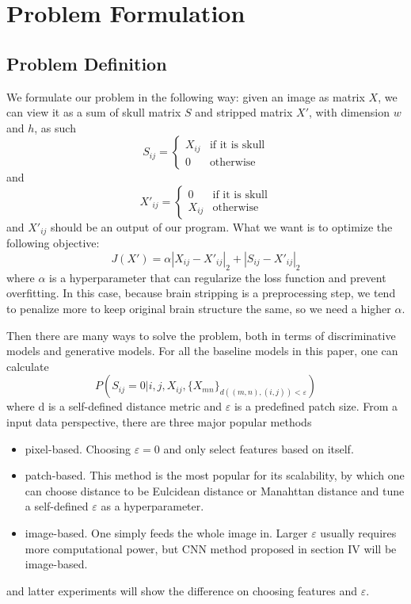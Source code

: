 \documentclass[conference]{IEEEtran}
\begin{document}
\section{Problem Formulation}
\subsection*{Problem Definition}
We formulate our problem in the following way: given an image as matrix $X$, we can view it as a sum of skull matrix $S$ and stripped matrix $X'$, with dimension $w$ and $h$, as such 
\[
S_{ij} = 
\begin{cases}
X_{ij} &\text{if it is skull} \\
0 &\text{otherwise}
\end{cases}
\]
and 
\[
X'_{ij} = 
\begin{cases}
0 &\text{if it is skull} \\
X_{ij} &\text{otherwise}
\end{cases}
\]
and $X'_{ij}$ should be an output of our program. What we want is to optimize the following objective: 
\[
J(X') = \alpha{|X_{ij} -X'_{ij}|_2} + |S_{ij} - X'_{ij}|_2
\]
where $\alpha$ is a hyperparameter that can regularize the loss function and prevent overfitting. In this case, because brain stripping is a preprocessing step, we tend to penalize more to keep original brain structure the same, so we need a higher $\alpha$. 

Then there are many ways to solve the problem, both in terms of discriminative models and generative models. For all the baseline models in this paper, one can calculate 
\[
P(S_{ij} = 0 | i, j, X_{ij}, \{X_{mn}\}_{d((m,n), (i, j)) < \varepsilon})
\] 
where d is a self-defined distance metric and $\varepsilon$ is a predefined patch size. 
From a input data perspective, there are three major popular methods
\begin{itemize}
\item pixel-based. Choosing $\varepsilon = 0$ and only select features based on itself.
\item patch-based. This method is the most popular for its scalability, by which one can choose distance to be Eulcidean distance or Manahttan distance and tune a self-defined $\varepsilon$ as a hyperparameter. 
\item image-based. One simply feeds the whole image in. Larger $\varepsilon$ usually requires more computational power, but CNN method proposed in section IV will be image-based.
\end{itemize}
and latter experiments will show the difference on choosing features and $\varepsilon$.
\end{document}
